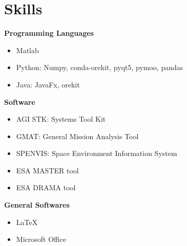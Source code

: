 \documentclass[11pt,a4paper, sans]{moderncv}
\begin{document}
\section{Skills}
\vspace{5pt}
\textbf{Programming Languages}
\begin{itemize}
\item {Matlab}
\item{Python: Numpy, conda-orekit, pyqt5, pymoo, pandas}
\item{Java: JavaFx, orekit}
\end{itemize}
\vspace{5pt}
\textbf{Software}
\begin{itemize}
\item{AGI STK: Systems Tool Kit}
\item{GMAT: General Mission Analysis Tool}
\item{SPENVIS: Space Environment Information System}
\item{ESA MASTER tool}
\item{ESA DRAMA tool}
\end{itemize}
\vspace{5pt}
\textbf{General Softwares}
\begin{itemize}
\item {LaTeX}
\item {Microsoft Office}
\end{itemize}

\end{document}
